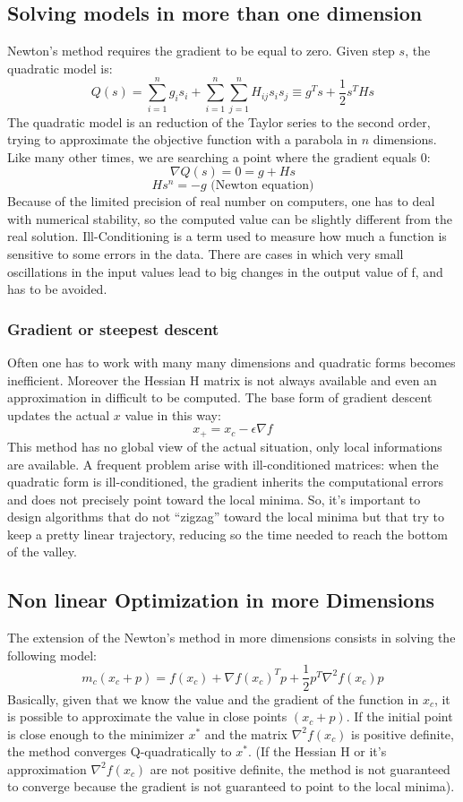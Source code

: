\documentclass[11pt]{article}
\begin{document}
\subsection{Solving models in more than one dimension}
Newton's method requires the gradient to be equal to zero. Given step $s$, the quadratic model is: $$Q(s) = \sum_{i=1}^{n} g_{i} s_{i} + \sum_{i=1}^{n} \sum_{j=1}^{n} H_{ij} s_{i} s_{j} \equiv g^{T} s + \frac{1}{2} s^{T} H s$$ The quadratic model is an reduction of the Taylor series to the second order, trying to approximate the objective function with a parabola in $n$ dimensions. Like many other times, we are searching a point where the gradient equals 0: $$ \nabla Q(s) = 0 = g +Hs $$ $$ Hs^{n} = -g \text{ (Newton equation)} $$ Because of the limited precision of real number on computers, one has to deal with numerical stability, so the computed value can be slightly different from the real solution. Ill-Conditioning is a term used to measure how much a function is sensitive to some errors in the data. There are cases in which very small oscillations in the input values lead to big changes in the output value of f, and has to be avoided.

\subsubsection{Gradient or steepest descent}
Often one has to work with many many dimensions and quadratic forms becomes inefficient. Moreover the Hessian H matrix is not always available and even an approximation in difficult to be computed. The base form of gradient descent updates the actual $x$ value in this way: $$ x_{+} = x_{c} - \epsilon \nabla f $$ This method has no global view of the actual situation, only local informations are available. A frequent problem arise with ill-conditioned matrices: when the quadratic form is ill-conditioned, the gradient inherits the computational errors and does not precisely point toward the local minima. So, it's important to design algorithms that do not ``zigzag'' toward the local minima but that try to keep a pretty linear trajectory, reducing so the time needed to reach the bottom of the valley.

\subsection{Non linear Optimization in more Dimensions}
The extension of the Newton's method in more dimensions consists in solving the following model: $$ m_{c} (x_{c} + p) = f(x_{c}) + \nabla f(x_{c})^T p + \frac{1}{2} p^T \nabla^2 f(x_{c}) p $$ Basically, given that we know the value and the gradient of the function in $x_{c}$, it is possible to approximate the value in close points $(x_{c} + p)$. If the initial point is close enough to the minimizer $x^*$ and the matrix $\nabla^2 f(x_{c})$ is positive definite, the method converges Q-quadratically to $x^*$. (If the Hessian H or it's approximation $\nabla^2 f(x_{c})$ are not positive definite, the method is not guaranteed to converge because the gradient is not guaranteed to point to the local minima).
\end{document}
